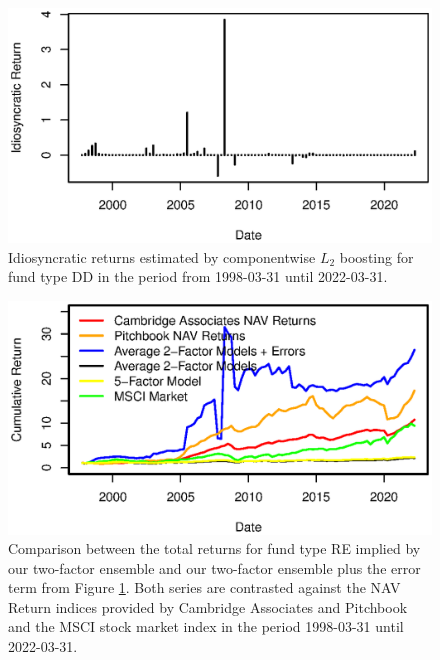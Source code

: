 \begin{figure}[H]
	\centering
	\includegraphics{Figures/XErrorSeriesNATRES}
	\caption{Idiosyncratic returns estimated by componentwise $L_2$ boosting for fund type DD in the period from 1998-03-31 until 2022-03-31.}
	\label{fig:clb_idio_natres}
\end{figure}

\begin{figure}[H]
	\centering
	\includegraphics{Figures/XTotalErrorSeriesNATRES}
	\caption{
		Comparison between the total returns for fund type RE implied by our two-factor ensemble and our two-factor ensemble plus the error term from Figure \ref{fig:clb_idio_natres}.
		Both series are contrasted against the NAV Return indices provided by Cambridge Associates and Pitchbook and the MSCI stock market index in the period 1998-03-31 until 2022-03-31.
	}
	\label{fig:clb_total_natres}
\end{figure}

